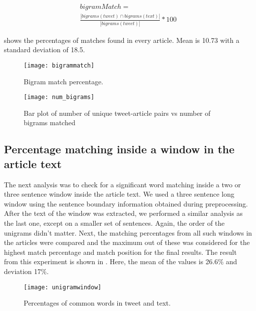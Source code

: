 \begin{multline}
bigramMatch = \\ \frac{| bigrams(tweet) \cap bigrams(text) |}{| bigrams(tweet) |} * 100
\end{multline}

 shows the percentages of matches found in every article. Mean is 10.73 with a standard deviation of 18.5.

\begin{figure}[htbp]
\centering
\texttt{[image: bigrammatch]}
\caption{Bigram match percentage.}
\label{fig:bigrammatch}
\end{figure}

\begin{figure}[htbp]
\centering
\texttt{[image: num\_bigrams]}
\caption{Bar plot of number of unique tweet-article pairs vs number of bigrams matched}
\label{fig:num_bigrams}
\end{figure}

\subsection{Percentage matching inside a window in the article text}

The next analysis was to check for a significant word matching inside a two or three sentence window inside the article text. We used a three sentence long window using the sentence boundary information obtained during preprocessing. After the text of the window was extracted, we performed a similar analysis as the last one, except on a smaller set of sentences. Again, the order of the unigrams didn't matter. Next, the matching percentages from all such windows in the articles were compared and the maximum out of these was considered for the highest match percentage and match position for the final results. The result from this experiment is shown in . Here, the mean of the values is 26.6\% and deviation 17\%.


\begin{figure}[htbp]
\centering
\texttt{[image: unigramwindow]}
\caption{Percentages of common words in tweet and text.}
\label{fig:unigramwindow}
\end{figure}

